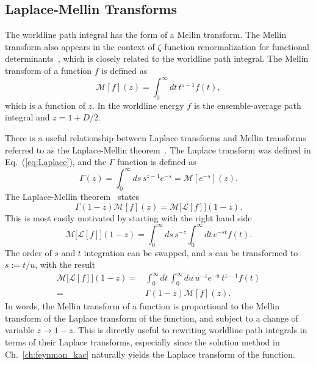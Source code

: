 \subsection{ Laplace-Mellin Transforms}

The worldline path integral has the form of a Mellin transform.  
The Mellin transform also appears in the context of $\zeta$-function renormalization for functional determinants~\cite{Elizalde2008},
which is closely related to the worldline path integral.  
The Mellin transform of a function $f$ is defined as 
\begin{equation}
\mathcal{M}[f](z)= \int_0^\infty dt\, t^{z-1}f(t),
\end{equation}
which is a function of $z$.  
In the worldline energy $f$ is the ensemble-average path integral and $z=1+D/2$.

There is a useful relationship between Laplace transforms and Mellin transforms referred to as the Laplace-Mellin theorem~\cite{Lew1975}.  
The Laplace transform was defined in Eq.~(\ref{eq:Laplace}), and the $\Gamma$ function is defined as  
\begin{equation}
\Gamma(z) = \int_0^\infty ds\, s^{z-1} e^{-s} = \mathcal{M}[e^{-s}](z).
\end{equation}
The Laplace-Mellin theorem~\cite{Lew1975} states
\begin{equation}
  \Gamma(1-z)\mathcal{M}[f](z) = \mathcal{M}\big[\mathcal{L}[f]\big](1-z)\label{eq:Laplace-Mellin}.
\end{equation}
This is most easily motivated by starting with the right hand side
\begin{equation}
\mathcal{M}\big[\mathcal{L}[f]\big](1-z) = 
\int_0^\infty ds\, s^{-z} \int_0^\infty dt\,e^{-st} f(t).
\end{equation}
The order of $s$ and $t$ integration can be swapped, and $s$ can be transformed to $s:=t/u$, with the 
result
\begin{align}
\mathcal{M}\big[\mathcal{L}[f]\big](1-z)=&\int_0^\infty dt\,\int_0^\infty du\, u^{-z} e^{-u}\,t^{z-1} f(t) \\
=& \Gamma(1-z)\mathcal{M}[f](z).
\end{align}
In words, the Mellin transform of a function is proportional to the Mellin transform of the Laplace transform of the function,
 and subject to a change of variable $z\rightarrow 1-z$.  This is 
directly useful to rewriting worldline path integrals in terms of their Laplace transforms, especially
since the solution method in Ch.~\ref{ch:feynman_kac} naturally yields the Laplace transform of the function.

